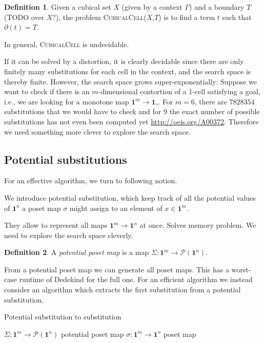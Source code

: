 \documentclass[11pt]{article}
\theoremstyle{definition}
\newtheorem{definition}{Definition}
\newcommand{\mname}[1]{\textit{{#1}}}
\newcommand{\problem}[1]{\textsc{{#1}}}
\newcommand{\pint}[1]{\mathbf{1}^{#1}}
\newcommand{\pow}[1]{\mathcal{P}({#1})}
\newcommand{\boundary}[1]{\partial({#1})}
\begin{document}
\begin{definition}
  Given a cubical set $X$ (given by a context $\Gamma$) and a boundary $T$ (TODO over $X$?), the problem
  \problem{CubicalCell}($X$,$T$) is to find a term $t$ such that $\boundary{t} = T$.
\end{definition}

In general, \problem{CubicalCell} is undecidable.

If it can be solved by a distortion, it is clearly decidable since there are
only finitely many substitutions for each cell in the context, and the search
space is thereby finite. However, the search space grows super-exponentially:
Suppose we want to check if there is an $m$-dimensional contortion of a 1-cell
satisfying a goal, i.e., we are looking for a monotone map $\pint{m} \to
\pint{}$,. For $m = 6$, there are $7828354$ substitutions that we would have to
check and for 9 the exact number of possible substitutions has not even been
computed yet \url{http://oeis.org/A00372}. Therefore we need something more
clever to explore the search space.


\subsection{Potential substitutions}

For an effective algorithm, we turn to following notion.

We introduce potential substitution, which keep track of all the potential
values of $\pint{n}$ a poset map $\sigma$ might assign to an element of $x \in \pint{m}$.

They allow to represent all maps $\pint{m} \to \pint{n}$ at once.
Solves memory problem. We need to explore the search space cleverly.

\begin{definition}
  A \mname{potential poset map} is a map $\Sigma : \pint{m} \to \pow{\pint{n}}$.
\end{definition}

From a potential poset map we can generate all poset maps. This has a worst-case
runtime of Dedekind for the full one. For an efficient algorithm we instead
consider an algorithm which extracts the first substitution from a potential
substitution. 

\begin{algorithm}[H]
  \caption{Potential substitution to substitution}\label{alg:simple}
  \begin{algorithmic}
    \Require $\Sigma : \pint{m} \to \pow{\pint{n}}$ potential poset map
    \Ensure $\sigma : \pint{m} \to \pint{n}$ poset map
    
  \end{algorithmic}
\end{algorithm}
\end{document}
